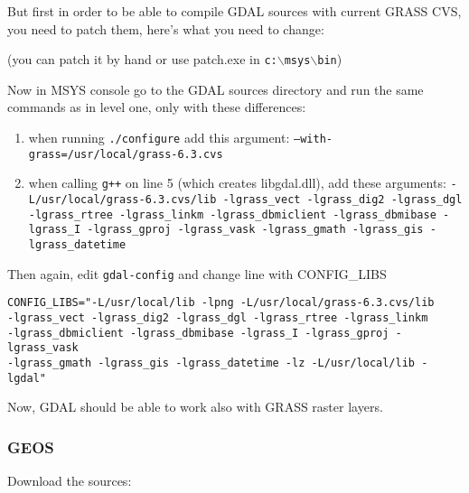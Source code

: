 But first in order to be able to compile GDAL sources with current GRASS CVS, you need to patch them, here's what you need to change:

	\begin{quotation}
	\end{quotation}
(you can patch it by hand or use patch.exe in \texttt{c:$\backslash$msys$\backslash$bin})

Now in MSYS console go to the GDAL sources directory and run the same commands as in level one, only with these differences:

\begin{enumerate}
\item when running \texttt{./configure} add this argument: \texttt{--with-grass=/usr/local/grass-6.3.cvs}
\item when calling \texttt{g++} on line 5 (which creates libgdal.dll), add these arguments: \texttt{-L/usr/local/grass-6.3.cvs/lib -lgrass\_vect -lgrass\_dig2 -lgrass\_dgl -lgrass\_rtree -lgrass\_linkm -lgrass\_dbmiclient -lgrass\_dbmibase -lgrass\_I -lgrass\_gproj -lgrass\_vask -lgrass\_gmath -lgrass\_gis -lgrass\_datetime}
\end{enumerate}

Then again, edit \texttt{gdal-config} and change line with CONFIG\_LIBS

\begin{verbatim}
CONFIG_LIBS="-L/usr/local/lib -lpng -L/usr/local/grass-6.3.cvs/lib 
-lgrass_vect -lgrass_dig2 -lgrass_dgl -lgrass_rtree -lgrass_linkm 
-lgrass_dbmiclient -lgrass_dbmibase -lgrass_I -lgrass_gproj -lgrass_vask 
-lgrass_gmath -lgrass_gis -lgrass_datetime -lz -L/usr/local/lib -lgdal" 
\end{verbatim}

Now, GDAL should be able to work also with GRASS raster layers.

\subsubsection{GEOS}
Download the sources:

	\begin{quotation}
	\end{quotation}

